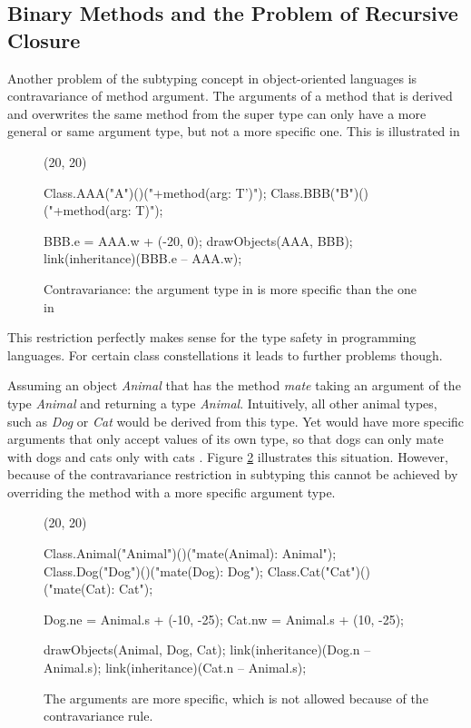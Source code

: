 \subsection{Binary Methods and the Problem of Recursive Closure}
\label{sec:recursiveClosure}
 Another problem of the subtyping concept in
object-oriented languages is contravariance of method argument. The
arguments of a method that is derived and overwrites the same method from
the super type can only have a more general or same argument type, but
not a more specific one. This is illustrated in 

\begin{figure}[H]
	\centering
	\begin{emp}[classdiag](20, 20)

		 Class.AAA("A")()("+method(arg: T')");
		 Class.BBB("B")()("+method(arg: T)");

		 BBB.e = AAA.w + (-20, 0);
		 drawObjects(AAA, BBB);
		 link(inheritance)(BBB.e -- AAA.w);

	\end{emp}
	\caption[Contravariance of argument type in \B and \A]{Contravariance: the argument type in \B is more specific than the one in \A}
	\label{fig:contravariance}
\end{figure}


This restriction perfectly makes sense for the type safety in programming
languages. For certain class constellations it leads to further problems
though.

Assuming an object \emph{Animal} that has the method \emph{mate}
taking an argument of the type \emph{Animal} and returning a type
\emph{Animal}. Intuitively, all other animal types, such as \emph{Dog} or
\emph{Cat} would be derived from this type. Yet would have more specific
arguments that only accept values of its own type, so that dogs can only
mate with dogs and cats only with cats \cite{simons_theory_2003-1}. Figure
\ref{fig:animalContravariance} illustrates this situation. However,
because of the contravariance restriction in subtyping this cannot be
achieved by overriding the method with a more specific argument type.

\begin{figure}[H]
	\centering
	\begin{emp}[classdiag](20, 20)

		Class.Animal("Animal")()("mate(Animal): Animal");
		Class.Dog("Dog")()("mate(Dog): Dog");
		Class.Cat("Cat")()("mate(Cat): Cat");

		Dog.ne = Animal.s + (-10, -25);
		Cat.nw = Animal.s + (10, -25);

		drawObjects(Animal, Dog, Cat);
		link(inheritance)(Dog.n -- Animal.s);
		link(inheritance)(Cat.n -- Animal.s);

	\end{emp}
	\caption[More specific arguments]{The arguments are more specific, which is not allowed because of the contravariance rule.}
	\label{fig:animalContravariance}
\end{figure}

